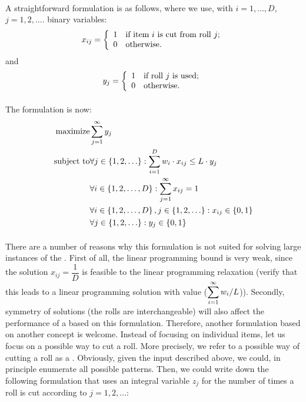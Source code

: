 \paragraph{}
A straightforward formulation is as follows, where we use, with $i=1,\ldots,D$, $j=1,2,\ldots$. binary variables:
\begin{equation}
\semboolvar{x_{ij}}{if item $i$ is cut from roll $j$;}{otherwise.}
\end{equation}
and
\begin{equation}
\semboolvar{y_j}{if roll $j$ is used;}{otherwise.}
\end{equation}
\paragraph{}
The formulation is now:
\begin{eqnarray}
\mbox{maximize}&\sumieqb[j]{1}{\infty}{y_j}\eqnlab{cutting-m}\\
\mbox{subject to}&\forall j\in\accl{1,2,\ldots}:\sumieqb[i]{1}{D}{w_i\cdot x_{ij}}\leq L\cdot y_j\eqnlab{cutting-c1}\\
&\forall i\in\accl{1,2,\ldots,D}:\sumieqb[j]{1}{\infty}{x_{ij}}=1\eqnlab{cutting-c2}\\
&\forall i\in\accl{1,2,\ldots,D},j\in\accl{1,2,\ldots}:x_{ij}\in\accl{0,1}\eqnlab{cutting-c3}\\
&\forall j\in\accl{1,2,\ldots}:y_j\in\accl{0,1}\eqnlab{cutting-c4}
\end{eqnarray}

\paragraph{}
There are a number of reasons why this formulation is not suited for solving large instances of the . First of all, the linear programming bound is very weak, since the solution $x_{ij}=\dfrac{1}{D}$ is feasible to the linear programming relaxation (verify that this leads to a linear programming solution with value ($\sumieqb[i]{1}{\infty}{w_i/L}$)). Secondly, symmetry of solutions (the rolls are interchangeable) will also affect the performance of a  based on this formulation. Therefore, another formulation based on another concept is welcome. Instead of focusing on individual items, let us focus on a possible way to cut a roll. More precisely, we refer to a possible way of cutting a roll as a . Obviously, given the input described above, we could, in principle enumerate all possible patterns. Then, we could write down the following formulation that uses an integral variable $z_j$ for the number of times a roll is cut according to  $j=1,2,\ldots$:

